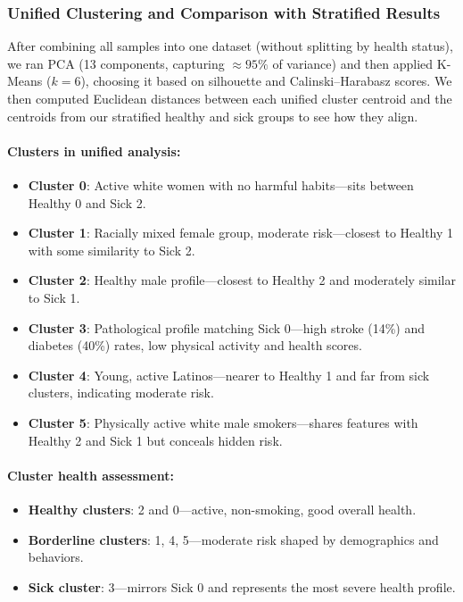 \documentclass[12pt, a4paper]{article}
\begin{document}
\subsubsection{Unified Clustering and Comparison with Stratified Results}

After combining all samples into one dataset (without splitting by health status), we ran PCA (13 components, capturing $\approx95\%$ of variance) and then applied K-Means ($k=6$), choosing it based on silhouette and Calinski–Harabasz scores. We then computed Euclidean distances between each unified cluster centroid and the centroids from our stratified healthy and sick groups to see how they align.

\paragraph{Clusters in unified analysis:}
\begin{itemize}
  \item \textbf{Cluster 0}: Active white women with no harmful habits—sits between Healthy 0 and Sick 2.
  \item \textbf{Cluster 1}: Racially mixed female group, moderate risk—closest to Healthy 1 with some similarity to Sick 2.
  \item \textbf{Cluster 2}: Healthy male profile—closest to Healthy 2 and moderately similar to Sick 1.
  \item \textbf{Cluster 3}: Pathological profile matching Sick 0—high stroke (14\%) and diabetes (40\%) rates, low physical activity and health scores.
  \item \textbf{Cluster 4}: Young, active Latinos—nearer to Healthy 1 and far from sick clusters, indicating moderate risk.
  \item \textbf{Cluster 5}: Physically active white male smokers—shares features with Healthy 2 and Sick 1 but conceals hidden risk.
\end{itemize}

\paragraph{Cluster health assessment:}
\begin{itemize}
  \item \textbf{Healthy clusters}: 2 and 0—active, non-smoking, good overall health.
  \item \textbf{Borderline clusters}: 1, 4, 5—moderate risk shaped by demographics and behaviors.
  \item \textbf{Sick cluster}: 3—mirrors Sick 0 and represents the most severe health profile.
\end{itemize}
\end{document}
